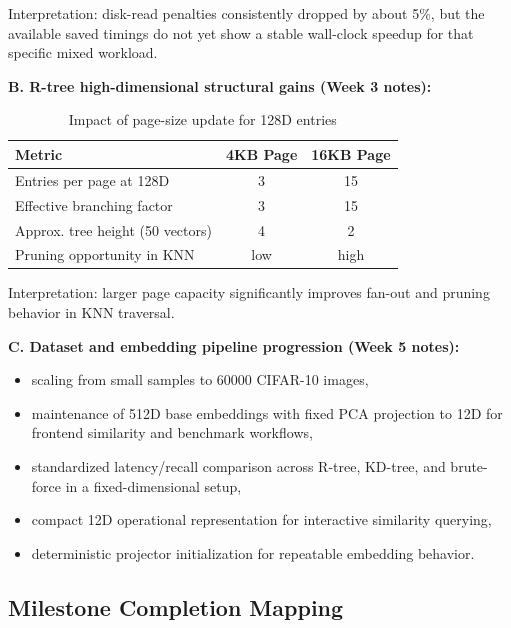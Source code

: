 \documentclass[11pt,a4paper]{article}
\begin{document}
Interpretation: disk-read penalties consistently dropped by about 5\%, but the available saved timings do not yet show a stable wall-clock speedup for that specific mixed workload.

\textbf{B. R-tree high-dimensional structural gains (Week 3 notes):}

\begin{table}[H]
\centering
\caption{Impact of page-size update for 128D entries}
\begin{tabular}{lcc}
\toprule
Metric & 4KB Page & 16KB Page \\
\midrule
Entries per page at 128D & 3 & 15 \\
Effective branching factor & 3 & 15 \\
Approx. tree height (50 vectors) & 4 & 2 \\
Pruning opportunity in KNN & low & high \\
\bottomrule
\end{tabular}
\end{table}

Interpretation: larger page capacity significantly improves fan-out and pruning behavior in KNN traversal.

\textbf{C. Dataset and embedding pipeline progression (Week 5 notes):}

\begin{itemize}[leftmargin=1.5em]
  \item scaling from small samples to 60000 CIFAR-10 images,
  \item maintenance of 512D base embeddings with fixed PCA projection to 12D for frontend similarity and benchmark workflows,
  \item standardized latency/recall comparison across R-tree, KD-tree, and brute-force in a fixed-dimensional setup,
  \item compact 12D operational representation for interactive similarity querying,
  \item deterministic projector initialization for repeatable embedding behavior.
\end{itemize}

\subsection{Milestone Completion Mapping}
\end{document}
